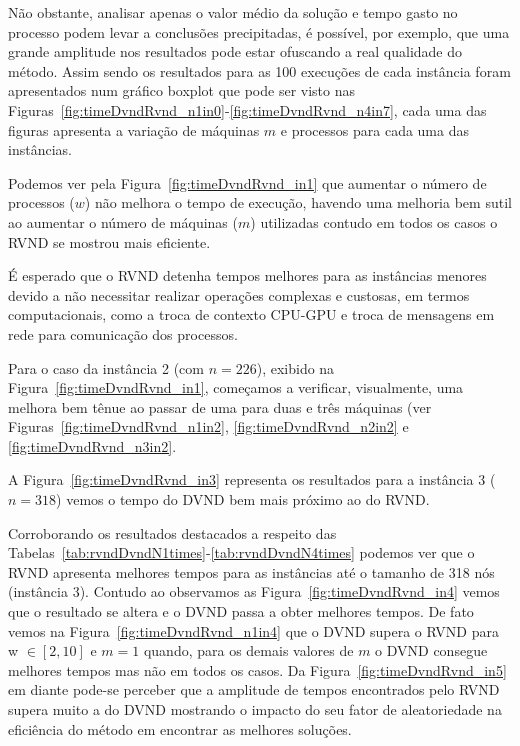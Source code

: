 

% 
% 
% 
% 



Não obstante, analisar apenas o valor médio da solução e tempo gasto no processo podem levar a conclusões precipitadas, é possível, por exemplo, que uma grande amplitude nos resultados pode estar ofuscando a real qualidade do método. Assim sendo os resultados para as 100 execuções de cada instância foram apresentados num gráfico boxplot que pode ser visto nas Figuras~\ref{fig:timeDvndRvnd_n1in0}-\ref{fig:timeDvndRvnd_n4in7}, cada uma das figuras apresenta a variação de máquinas $m$ e processos para cada uma das instâncias.


Podemos ver pela Figura~\ref{fig:timeDvndRvnd_in1} que aumentar o número de processos ($w$) não melhora o tempo de execução, havendo uma melhoria bem sutil ao aumentar o número de máquinas ($m$) utilizadas contudo em todos os casos o RVND se mostrou mais eficiente.

É esperado que o RVND detenha tempos melhores para as instâncias menores devido a não necessitar realizar operações complexas e custosas, em termos computacionais, como a troca de contexto CPU-GPU e troca de mensagens em rede para comunicação dos processos.


Para o caso da instância 2 (com $n=226$), exibido na Figura~\ref{fig:timeDvndRvnd_in1}, começamos a verificar, visualmente, uma melhora bem tênue ao passar de uma para duas e três máquinas (ver Figuras~\ref{fig:timeDvndRvnd_n1in2}, \ref{fig:timeDvndRvnd_n2in2} e \ref{fig:timeDvndRvnd_n3in2}.


A Figura~\ref{fig:timeDvndRvnd_in3} representa os resultados para a instância 3 ($n=318$) vemos o tempo do DVND bem mais próximo ao do RVND.

Corroborando os resultados destacados a respeito das Tabelas~\ref{tab:rvndDvndN1times}-\ref{tab:rvndDvndN4times} podemos ver que o RVND apresenta melhores tempos para as instâncias até o tamanho de 318 nós (instância 3).
Contudo ao observamos as Figura~\ref{fig:timeDvndRvnd_in4} vemos que o resultado se altera e o DVND passa a obter melhores tempos.
De fato vemos na Figura~\ref{fig:timeDvndRvnd_n1in4} que o DVND supera o RVND para w $\in [2,10]$ e $m=1$ quando, para os demais valores de $m$ o DVND consegue melhores tempos mas não em todos os casos.
Da Figura~\ref{fig:timeDvndRvnd_in5} em diante pode-se perceber que a amplitude de tempos encontrados pelo RVND supera muito a do DVND mostrando o impacto do seu fator de aleatoriedade na eficiência do método em encontrar as melhores soluções.

